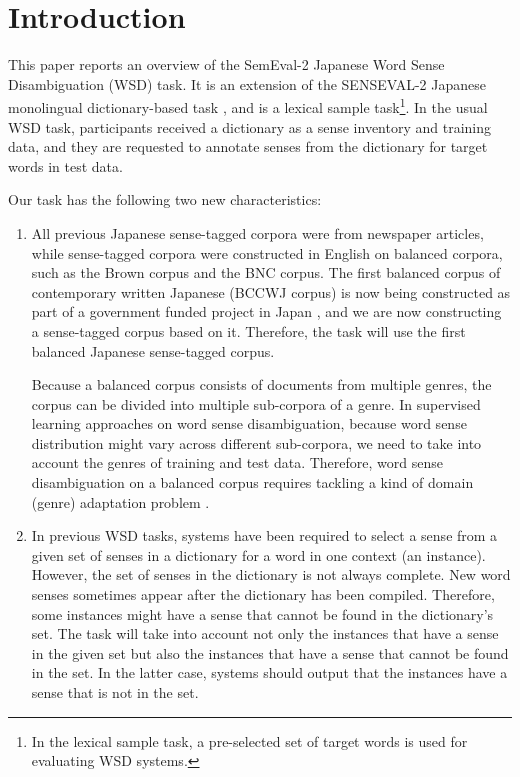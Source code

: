 \documentclass[english]{jnlp_1.4}
\begin{document}
\maketitle


\section{Introduction}

This paper reports an overview of the SemEval-2 Japanese Word Sense
Disambiguation (WSD) task. It is an extension of the SENSEVAL-2 Japanese monolingual
dictionary-based task \cite{shirai:01:a}, and is a lexical sample
task\footnote{In the lexical sample task, a pre-selected set of
    target words is used for evaluating WSD systems.}. In the usual
WSD task, participants received a dictionary as a sense
  inventory and training data, and they are requested to annotate senses
  from the dictionary for target words in test data.

Our task has the following two new characteristics:
\begin{enumerate}
\item All previous Japanese sense-tagged corpora were from newspaper
   articles, while sense-tagged corpora were constructed in
   English on balanced corpora, such as the Brown corpus and the BNC
   corpus. The first balanced corpus of contemporary written Japanese
   (BCCWJ corpus) is now being constructed as part of a government
   funded project in Japan \cite{maekawa:08:a}, and we are now
   constructing a sense-tagged corpus based on it. Therefore, the task will use the first
   balanced Japanese sense-tagged corpus.

Because a balanced corpus consists of documents from multiple genres, the
corpus can be divided into multiple sub-corpora of a genre. 
In supervised learning approaches on word sense disambiguation, because
word sense distribution might vary across different sub-corpora, we
need to take into account the genres of training and test
data. Therefore, word sense disambiguation on a balanced corpus
requires tackling a kind of domain (genre) adaptation
problem \cite{chang:06:a,agirre:08:a}.
\item In previous WSD tasks, systems have been required to select a sense
   from a given set of senses in a dictionary for a word in one
   context (an instance). However, the set of senses in the dictionary
   is not always complete. New word senses sometimes appear after the
   dictionary has been compiled. Therefore, some instances might have
   a sense that cannot be found in the dictionary's set. The task
   will take into account not only the instances that have a sense in the
   given set but also the instances that have a sense that cannot be
   found in the set. In the latter case, systems should output that
   the instances have a sense that is not in the set.
\end{enumerate}
\end{document}
